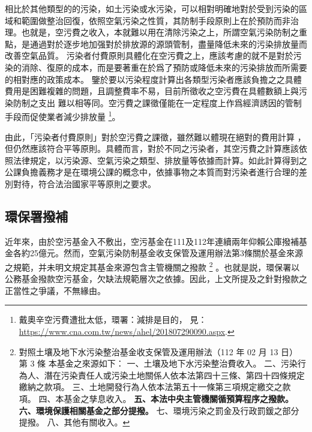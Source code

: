 \documentclass[12pt,a4paper]{article}
\begin{document}
相比於其他類型的的污染，如土污染或水污染，可以相對明確地對於受到污染的區域和範圍做整治回復，依照空氣污染之性質，其防制手段原則上在於預防而非治理。也就是，空污費之收入，本就難以用在清除污染之上，所謂空氣污染防制之重點，是通過對於逐步地加强對於排放源的源頭管制，盡量降低未來的污染排放量而改善空氣品質。
污染者付費原則具體化在空污費之上，應該考慮的就不是對於污染的消除、復原的成本，而是要著重在於爲了預防或降低未來的污染排放而所需要的相對應的政策成本。
鑒於要以污染程度計算出各類型污染者應該負擔之之具體費用是困難複雜的問題，且調整費率不易，目前所徵收之空污費在具體數額上與污染防制之支出
難以相等同。空污費之課徵僅能在一定程度上作爲經濟誘因的管制手段而促使業者減少排放量
\footnote{戴奧辛空污費遭批太低，環署：減排是目的，
見：\url{https://www.cna.com.tw/news/ahel/201807290090.aspx}.}。

由此，「污染者付費原則」對於空污費之課徵，雖然難以體現在絕對的費用計算
，但仍然應該符合平等原則。具體而言，對於不同之污染者，其空污費之計算應該依照法律規定，以污染源、空氣污染之類型、排放量等依據而計算。如此計算得到之公課負擔義務才是在環境公課的概念中，依據事物之本質而對污染者進行合理的差別對待，符合法治國家平等原則之要求。


\subsection{環保署撥補}

近年來，由於空污基金入不敷出，空污基金在111及112年連續兩年仰賴公庫撥補基金各約25億元。然而，空氣污染防制基金收支保管及運用辦法第3條關於基金來源之規範，并未明文規定其基金來源包含主管機關之撥款
\footnote{
對照土壤及地下水污染整治基金收支保管及運用辦法（112 年 02 月 13 日）
第 3 條
本基金之來源如下：
一、土壤及地下水污染整治費收入。
二、污染行為人、潛在污染責任人或污染土地關係人依本法第四十三條、第四十四條規定繳納之款項。
三、土地開發行為人依本法第五十一條第三項規定繳交之款項。
四、本基金之孳息收入。
\textbf{五、本法中央主管機關循預算程序之撥款。
六、環境保護相關基金之部分提撥。}
七、環境污染之罰金及行政罰鍰之部分提撥。
八、其他有關收入。}
。也就是説，環保署以公務基金撥款空污基金，欠缺法規範層次之依據。因此，上文所提及之針對撥款之正當性之爭議，不無緣由。
\end{document}
